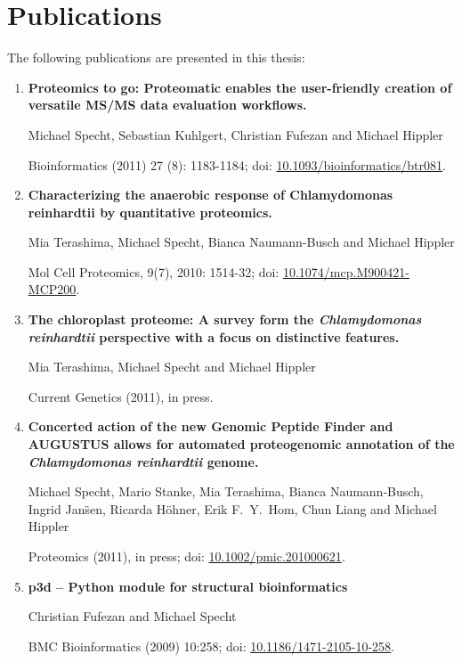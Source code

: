 \chapter{Publications}

The following publications are presented in this thesis:

\begin{enumerate}
\item 
{\bf Proteomics to go: Proteomatic enables the user-friendly creation of versatile MS/MS data evaluation workflows.}

Michael Specht, Sebastian Kuhlgert, Christian Fufezan and Michael Hippler

Bioinformatics (2011) 27 (8): 1183-1184; doi: \href{http://dx.doi.org/10.1093/bioinformatics/btr081}{10.1093/bioinformatics/btr081}.

\item
{\bf Characterizing the anaerobic response of Chlamydomonas reinhardtii by quantitative proteomics.}

Mia Terashima, Michael Specht, Bianca Naumann-Busch and Michael Hippler

Mol Cell Proteomics, 9(7), 2010: 1514-32; doi: \href{http://dx.doi.org/10.1074/mcp.M900421-MCP200}{10.1074/mcp.M900421-MCP200}.

\item
{\bf The chloroplast proteome: A survey form the {\em Chlamydomonas reinhardtii} perspective with a focus on distinctive features.}

Mia Terashima, Michael Specht and Michael Hippler

Current Genetics (2011), in press.

\item
{\bf Concerted action of the new Genomic Peptide Finder and AUGUSTUS allows for automated proteogenomic annotation of the {\em Chlamydomonas reinhardtii} genome.}

Michael Specht, Mario Stanke, Mia Terashima, Bianca Naumann-Busch, Ingrid Jan\"sen, Ricarda H\"ohner, Erik F.~Y.~Hom, Chun Liang and Michael Hippler

Proteomics (2011), in press; doi: \href{http://dx.doi.org/10.1002/pmic.201000621}{10.1002/pmic.201000621}.

% 
\item
{\bf p3d -- Python module for structural bioinformatics}

Christian Fufezan and Michael Specht

BMC Bioinformatics (2009) 10:258; doi: \href{http://dx.doi.org/10.1186/1471-2105-10-258}{10.1186/1471-2105-10-258}.

\end{enumerate}

